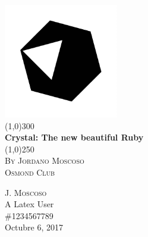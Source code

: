 \documentclass{article}
\begin{document}
\begin{titlepage}
	\begin{center}
	\includegraphics[width=5cm]{Title3-84413ce8.png}\\
	\line(1,0){300}\\
	[0.5cm]
	\huge{\bfseries Crystal: The new beautiful Ruby}\\
	[0.1cm]
	\line(1,0){250}\\
	\textsc{\LARGE By Jordano Moscoso}\\
	\textsc{\Large Osmond Club}\\
	[8cm]
	\end{center}
	\begin{flushright}
	\textsc{\large J. Moscoso}\\
	A Latex User \\
	\#1234567789 \\
	Octubre 6, 2017 \\
	\end{flushright}
\end{titlepage}
\end{document}
